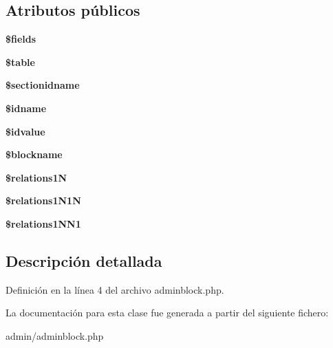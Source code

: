 \subsection*{\-Atributos públicos}
\begin{DoxyCompactItemize}
\item 
\hypertarget{classadminblock_a86efd09cdc94c3fdaa3b5abbfc74fbef}{{\bfseries \$fields}}\label{classadminblock_a86efd09cdc94c3fdaa3b5abbfc74fbef}

\item 
\hypertarget{classadminblock_aff6ad656e948f5a333e940e59cc923b2}{{\bfseries \$table}}\label{classadminblock_aff6ad656e948f5a333e940e59cc923b2}

\item 
\hypertarget{classadminblock_a65a19960858ea506655592cb1fc5bb0e}{{\bfseries \$sectionidname}}\label{classadminblock_a65a19960858ea506655592cb1fc5bb0e}

\item 
\hypertarget{classadminblock_a61b563c0dfeec8a659713b5db1ac3b0b}{{\bfseries \$idname}}\label{classadminblock_a61b563c0dfeec8a659713b5db1ac3b0b}

\item 
\hypertarget{classadminblock_a193ac3c47d509ca1464480c73b7dac7b}{{\bfseries \$idvalue}}\label{classadminblock_a193ac3c47d509ca1464480c73b7dac7b}

\item 
\hypertarget{classadminblock_a114998a4cea5bc508c8787af12f525ed}{{\bfseries \$blockname}}\label{classadminblock_a114998a4cea5bc508c8787af12f525ed}

\item 
\hypertarget{classadminblock_a8aff2f80ea6041741f0aff93b5f86e3e}{{\bfseries \$relations1\-N}}\label{classadminblock_a8aff2f80ea6041741f0aff93b5f86e3e}

\item 
\hypertarget{classadminblock_a4da890b0eaa88cf3c3214ea4cb0c2d9c}{{\bfseries \$relations1\-N1\-N}}\label{classadminblock_a4da890b0eaa88cf3c3214ea4cb0c2d9c}

\item 
\hypertarget{classadminblock_a92be1741e34afc7c85f574e557b4fca2}{{\bfseries \$relations1\-N\-N1}}\label{classadminblock_a92be1741e34afc7c85f574e557b4fca2}

\end{DoxyCompactItemize}


\subsection{\-Descripción detallada}


\-Definición en la línea 4 del archivo adminblock.\-php.



\-La documentación para esta clase fue generada a partir del siguiente fichero\-:\begin{DoxyCompactItemize}
\item 
admin/adminblock.\-php\end{DoxyCompactItemize}
